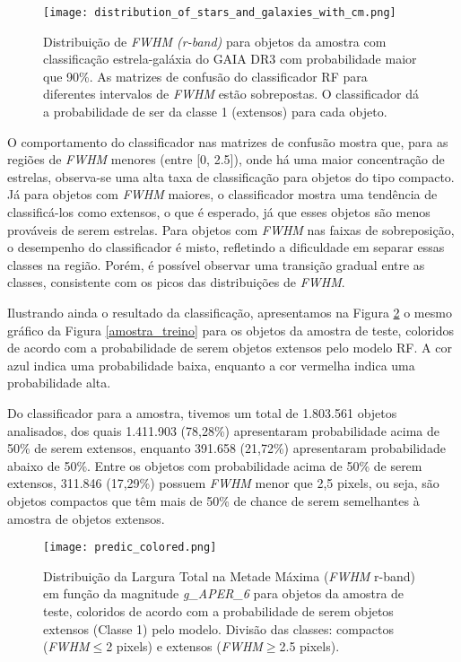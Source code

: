 \begin{figure}[!ht]
    \centering
    \texttt{[image: distribution\_of\_stars\_and\_galaxies\_with\_cm.png]}
    \caption[]{Distribuição de \textit{FWHM (r-band)} para objetos da amostra com classificação estrela-galáxia do GAIA DR3 com probabilidade maior que 90\%. As matrizes de confusão do classificador RF para diferentes intervalos de \textit{FWHM} estão sobrepostas. O classificador dá a probabilidade de ser da classe 1 (extensos) para cada objeto. }
    \label{probabilidade_extensos_fwhm}
\end{figure}

O comportamento do classificador nas matrizes de confusão mostra que, para as regiões de \textit{FWHM} menores (entre [0, 2.5]), onde há uma maior concentração de estrelas, observa-se uma alta taxa de classificação para objetos do tipo compacto. Já para objetos com \textit{FWHM} maiores, o classificador mostra uma tendência de classificá-los como extensos, o que é esperado, já que esses objetos são menos prováveis de serem estrelas. Para objetos com \textit{FWHM} nas faixas de sobreposição, o desempenho do classificador é misto, refletindo a dificuldade em separar essas classes na região. Porém, é possível observar uma transição gradual entre as classes, consistente com os picos das distribuições de \textit{FWHM}.

Ilustrando ainda o resultado da classificação, apresentamos na Figura \ref{predic_colored} o mesmo gráfico da Figura \ref{amostra_treino} para os objetos da amostra de teste, coloridos de acordo com a probabilidade de serem objetos extensos pelo modelo RF. A cor azul indica uma probabilidade baixa, enquanto a cor vermelha indica uma probabilidade alta. 

Do classificador para a amostra, tivemos um total de 1.803.561 objetos analisados, dos quais 1.411.903 (78,28\%) apresentaram probabilidade acima de 50\% de serem extensos, enquanto 391.658 (21,72\%) apresentaram probabilidade abaixo de 50\%. Entre os objetos com probabilidade acima de 50\% de serem extensos, 311.846 (17,29\%) possuem \textit{FWHM} menor que 2,5 pixels, ou seja, são objetos compactos que têm mais de 50\% de chance de serem semelhantes à amostra de objetos extensos.

\begin{figure}[!ht]
    \centering
    \texttt{[image: predic\_colored.png]}
    \caption[]{Distribuição da Largura Total na Metade Máxima (\textit{FWHM} r-band) em função da magnitude \textit{g\_APER\_6} para objetos da amostra de teste, coloridos de acordo com a probabilidade de serem objetos extensos (Classe 1) pelo modelo. Divisão das classes: compactos (\textit{FWHM}$\leq$2 pixels) e extensos (\textit{FWHM}$\geq$2.5 pixels).}
    \label{predic_colored}
\end{figure}

